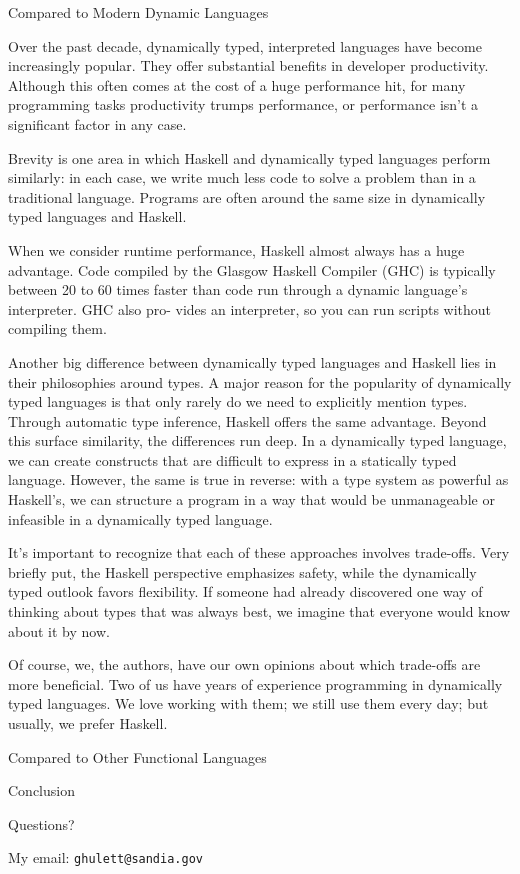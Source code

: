 %
\begin{frame}{Compared to Modern Dynamic Languages}

Over the past decade, dynamically typed, interpreted languages have become increasingly popular. They offer substantial benefits in developer productivity. Although this often comes at the cost of a huge performance hit, for many programming tasks productivity trumps performance, or performance isn’t a significant factor in any case.

Brevity is one area in which Haskell and dynamically typed languages perform similarly: in each case, we write much less code to solve a problem than in a traditional language. Programs are often around the same size in dynamically typed languages and Haskell.

When we consider runtime performance, Haskell almost always has a huge advantage. Code compiled by the Glasgow Haskell Compiler (GHC) is typically between 20 to 60 times faster than code run through a dynamic language’s interpreter. GHC also pro- vides an interpreter, so you can run scripts without compiling them.

Another big difference between dynamically typed languages and Haskell lies in their philosophies around types. A major reason for the popularity of dynamically typed languages is that only rarely do we need to explicitly mention types. Through automatic type inference, Haskell offers the same advantage.
Beyond this surface similarity, the differences run deep. In a dynamically typed language, we can create constructs that are difficult to express in a statically typed language. However, the same is true in reverse: with a type system as powerful as Haskell’s, we can structure a program in a way that would be unmanageable or infeasible in a dynamically typed language.

It’s important to recognize that each of these approaches involves trade-offs.
Very briefly put, the Haskell perspective emphasizes safety, while the
dynamically typed outlook favors flexibility. If someone had already discovered
one way of thinking about types that was always best, we imagine that everyone
would know about it by now.

Of course, we, the authors, have our own opinions about which trade-offs are
more beneficial. Two of us have years of experience programming in dynamically
typed languages. We love working with them; we still use them every day; but
usually, we prefer Haskell.

\end{frame}

%
\begin{frame}{Compared to Other Functional Languages}



\end{frame}


%
\begin{frame}{Conclusion}

Questions?

My email: \texttt{ghulett@sandia.gov}

\end{frame}
